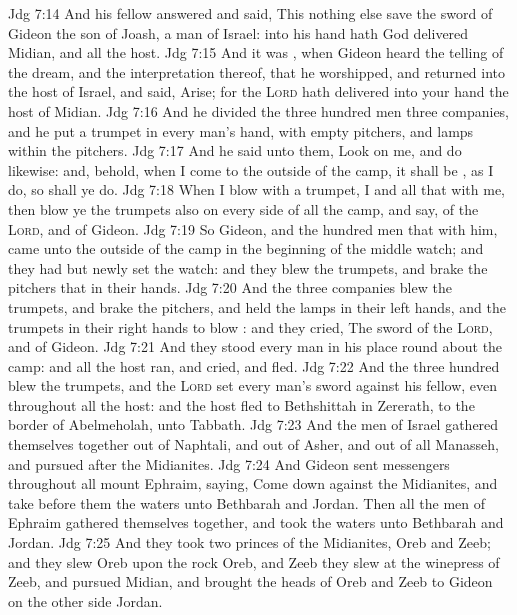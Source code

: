 \vs Jdg 7:14 And his fellow answered and said, This  nothing else save the sword of Gideon the son of Joash, a man of Israel:  into his hand hath God delivered Midian, and all the host.
\vs Jdg 7:15 And it was , when Gideon heard the telling of the dream, and the interpretation thereof, that he worshipped, and returned into the host of Israel, and said, Arise; for the \textsc{Lord} hath delivered into your hand the host of Midian.
\vs Jdg 7:16 And he divided the three hundred men  three companies, and he put a trumpet in every man's hand, with empty pitchers, and lamps within the pitchers.
\vs Jdg 7:17 And he said unto them, Look on me, and do likewise: and, behold, when I come to the outside of the camp, it shall be , as I do, so shall ye do.
\vs Jdg 7:18 When I blow with a trumpet, I and all that  with me, then blow ye the trumpets also on every side of all the camp, and say,  of the \textsc{Lord}, and of Gideon.
\vs Jdg 7:19 So Gideon, and the hundred men that  with him, came unto the outside of the camp in the beginning of the middle watch; and they had but newly set the watch: and they blew the trumpets, and brake the pitchers that  in their hands.
\vs Jdg 7:20 And the three companies blew the trumpets, and brake the pitchers, and held the lamps in their left hands, and the trumpets in their right hands to blow : and they cried, The sword of the \textsc{Lord}, and of Gideon.
\vs Jdg 7:21 And they stood every man in his place round about the camp: and all the host ran, and cried, and fled.
\vs Jdg 7:22 And the three hundred blew the trumpets, and the \textsc{Lord} set every man's sword against his fellow, even throughout all the host: and the host fled to Bethshittah in Zererath,  to the border of Abelmeholah, unto Tabbath.
\vs Jdg 7:23 And the men of Israel gathered themselves together out of Naphtali, and out of Asher, and out of all Manasseh, and pursued after the Midianites.
\vs Jdg 7:24 And Gideon sent messengers throughout all mount Ephraim, saying, Come down against the Midianites, and take before them the waters unto Bethbarah and Jordan. Then all the men of Ephraim gathered themselves together, and took the waters unto Bethbarah and Jordan.
\vs Jdg 7:25 And they took two princes of the Midianites, Oreb and Zeeb; and they slew Oreb upon the rock Oreb, and Zeeb they slew at the winepress of Zeeb, and pursued Midian, and brought the heads of Oreb and Zeeb to Gideon on the other side Jordan.
